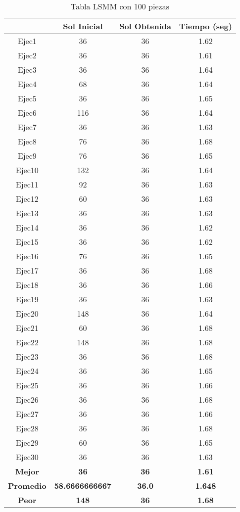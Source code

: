 
\begin{table}
\caption{Tabla LSMM con 100 piezas}
\centering
\begin{tabular}{|c|c|c|c|}
\hline
 & {\bf Sol Inicial} & {\bf Sol Obtenida} & {\bf Tiempo (seg)} \\
\hline
Ejec1 & 36 & 36  & 1.62 \\
\hline
Ejec2 & 36 & 36  & 1.61 \\
\hline
Ejec3 & 36 & 36  & 1.64 \\
\hline
Ejec4 & 68 & 36  & 1.64 \\
\hline
Ejec5 & 36 & 36  & 1.65 \\
\hline
Ejec6 & 116 & 36  & 1.64 \\
\hline
Ejec7 & 36 & 36  & 1.63 \\
\hline
Ejec8 & 76 & 36  & 1.68 \\
\hline
Ejec9 & 76 & 36  & 1.65 \\
\hline
Ejec10 & 132 & 36  & 1.64 \\
\hline
Ejec11 & 92 & 36  & 1.63 \\
\hline
Ejec12 & 60 & 36  & 1.63 \\
\hline
Ejec13 & 36 & 36  & 1.63 \\
\hline
Ejec14 & 36 & 36  & 1.62 \\
\hline
Ejec15 & 36 & 36  & 1.62 \\
\hline
Ejec16 & 76 & 36  & 1.65 \\
\hline
Ejec17 & 36 & 36  & 1.68 \\
\hline
Ejec18 & 36 & 36  & 1.66 \\
\hline
Ejec19 & 36 & 36  & 1.63 \\
\hline
Ejec20 & 148 & 36  & 1.64 \\
\hline
Ejec21 & 60 & 36  & 1.68 \\
\hline
Ejec22 & 148 & 36  & 1.68 \\
\hline
Ejec23 & 36 & 36  & 1.68 \\
\hline
Ejec24 & 36 & 36  & 1.65 \\
\hline
Ejec25 & 36 & 36  & 1.66 \\
\hline
Ejec26 & 36 & 36  & 1.68 \\
\hline
Ejec27 & 36 & 36  & 1.66 \\
\hline
Ejec28 & 36 & 36  & 1.68 \\
\hline
Ejec29 & 60 & 36  & 1.65 \\
\hline
Ejec30 & 36 & 36  & 1.63 \\
\hline
{\bf Mejor} & {\bf 36} & {\bf 36} & {\bf 1.61} \\
\hline
{\bf Promedio} & {\bf 58.6666666667} & {\bf 36.0} & {\bf 1.648} \\
\hline
{\bf Peor} & {\bf 148} & {\bf 36} & {\bf 1.68} \\
\hline
\end{tabular}
\end{table}

